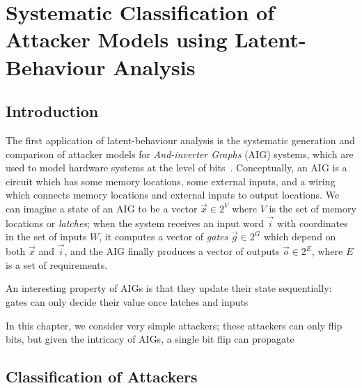 \chapter{Systematic Classification of Attacker Models using Latent-Behaviour Analysis}
\label{ch:Classification}
\section{Introduction}
\label{sec:Classification:LatentBehaviours}
The first application of latent-behaviour analysis is the systematic generation and comparison of attacker models for \emph{And-inverter Graphs} (AIG) systems, which are used to model hardware systems at the level of bits~\cite{??}. 
Conceptually, an AIG is a circuit which has some memory locations, some external inputs, and a wiring which connects memory locations and external inputs to output locations. We can imagine a state of an AIG to be a vector $\vec{x}\in 2^V$ where $V$ is the set of memory locations or \emph{latches}; when the system receives an input word $\vec{i}$ with coordinates in the set of inputs $W$, it computes a vector of \emph{gates} $\vec{g}\in 2^G$ which depend on both $\vec{x}$ and $\vec{i}$, and the AIG finally produces a vector of outputs $\vec{o}\in 2^E$, where $E$ is a set of requirements.

An interesting property of AIGs is that they update their state sequentially: gates can only decide their value once latches and inputs 

In this chapter, we consider very simple attackers; these attackers can only flip bits, but given the intricacy of AIGs, a single bit flip can propagate 

\section{Classification of Attackers}
\label{sec:Classification:ClassificationProblem}

